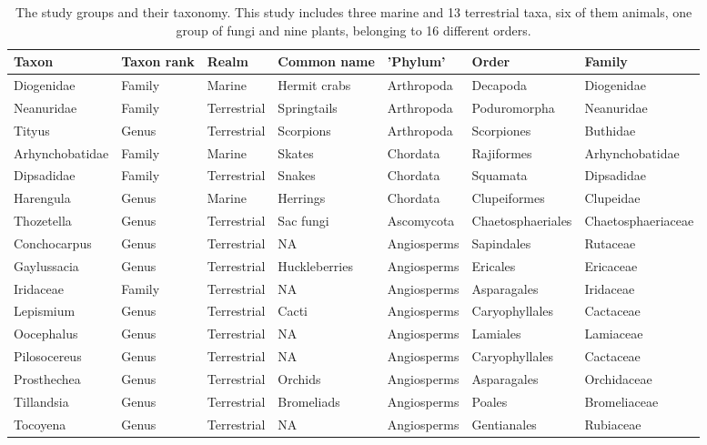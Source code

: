 \documentclass[fleqn,10pt,lineno]{wlpeerj} %
\begin{document}
\begin{landscape}\begin{table}

\caption{\label{tab:tabletaxa}The study groups and their taxonomy. This study includes three marine and 13 terrestrial taxa, six of them animals, one group of fungi and nine plants, belonging to 16 different orders.}
\centering
\fontsize{11}{13}\selectfont
\begin{tabular}[t]{>{\raggedright\arraybackslash}p{2.5cm}>{\raggedright\arraybackslash}p{2cm}>{\raggedright\arraybackslash}p{2cm}>{\raggedright\arraybackslash}p{2.5cm}>{\raggedright\arraybackslash}p{2.5cm}ll}
\toprule
Taxon & Taxon rank & Realm & Common name & 'Phylum' & Order & Family\\
\midrule
Diogenidae & Family & Marine & Hermit crabs & Arthropoda & Decapoda & Diogenidae\\
Neanuridae & Family & Terrestrial & Springtails & Arthropoda & Poduromorpha & Neanuridae\\
Tityus & Genus & Terrestrial & Scorpions & Arthropoda & Scorpiones & Buthidae\\
Arhynchobatidae & Family & Marine & Skates & Chordata & Rajiformes & Arhynchobatidae\\
Dipsadidae & Family & Terrestrial & Snakes & Chordata & Squamata & Dipsadidae\\
\addlinespace
Harengula & Genus & Marine & Herrings & Chordata & Clupeiformes & Clupeidae\\
\hline
Thozetella & Genus & Terrestrial & Sac fungi & Ascomycota & Chaetosphaeriales & Chaetosphaeriaceae\\
\hline
Conchocarpus & Genus & Terrestrial & NA & Angiosperms & Sapindales & Rutaceae\\
Gaylussacia & Genus & Terrestrial & Huckleberries & Angiosperms & Ericales & Ericaceae\\
Iridaceae & Family & Terrestrial & NA & Angiosperms & Asparagales & Iridaceae\\
\addlinespace
Lepismium & Genus & Terrestrial & Cacti & Angiosperms & Caryophyllales & Cactaceae\\
Oocephalus & Genus & Terrestrial & NA & Angiosperms & Lamiales & Lamiaceae\\
Pilosocereus & Genus & Terrestrial & NA & Angiosperms & Caryophyllales & Cactaceae\\
Prosthechea & Genus & Terrestrial & Orchids & Angiosperms & Asparagales & Orchidaceae\\
Tillandsia & Genus & Terrestrial & Bromeliads & Angiosperms & Poales & Bromeliaceae\\
\addlinespace
Tocoyena & Genus & Terrestrial & NA & Angiosperms & Gentianales & Rubiaceae\\
\bottomrule
\end{tabular}
\end{table}
\end{landscape}
\end{document}
